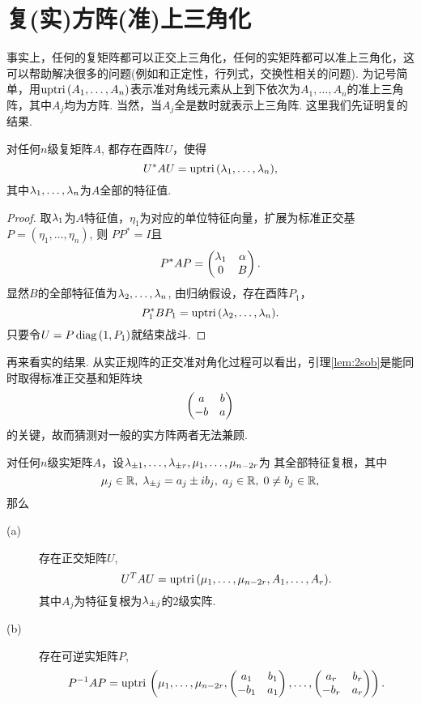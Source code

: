 \section{复(实)方阵(准)上三角化}
事实上，任何的复矩阵都可以正交上三角化，任何的实矩阵都可以准上三角化，这可以帮助解决很多的问题(例如和正定性，行列式，交换性相关的问题). 为记号简单，用$\operatorname*{uptri\,}(A_1,\dots,A_n)$表示准对角线元素从上到下依次为$A_1,\dots,A_n$的准上三角阵，其中$A_j$均为方阵. 当然，当$A_j$全是数时就表示上三角阵. 这里我们先证明复的结果.
\begin{thm}
	对任何$n$级复矩阵$A$, 都存在酉阵$U$，使得
	\[U^*AU=\operatorname*{uptri\,}(\lambda_1,\dots,\lambda_n),\]
	其中$\lambda_1,\dots,\lambda_n$为$A$全部的特征值.
\end{thm}
\begin{proof}
	取$\lambda_1$为$A$特征值，$\eta_1$为对应的单位特征向量，扩展为标准正交基$P=(\eta_1,\dots,\eta_n)$, 则
	$PP^*=I$且
	\[P^*AP=\begin{pmatrix}\lambda_1 & \alpha\\0 & B\end{pmatrix}.\]
	显然$B$的全部特征值为$\lambda_2,\dots,\lambda_n$, 由归纳假设，存在酉阵$P_1$，
	\[P_1^*B P_1=\operatorname*{uptri\,}(\lambda_2,\dots,\lambda_n).\]
	只要令$U=P\operatorname*{diag\,}(1,P_1)$就结束战斗.
\end{proof}
再来看实的结果. 从实正规阵的正交准对角化过程可以看出，引理\ref{lem:2sob}是能同时取得标准正交基和矩阵块
\[\begin{pmatrix} a & b\\ -b & a\end{pmatrix}\]
的关键，故而猜测对一般的实方阵两者无法兼顾.
\begin{thm}
	对任何$n$级实矩阵$A$，设$\lambda_{\pm 1},\dots,\lambda_{\pm r},\mu_1,\dots,\mu_{n-2r}$为
	其全部特征复根，其中
	\[\mu_j\in\mathbb{R},\;\lambda_{\pm j}=a_j\pm i b_j,\;a_j\in\mathbb{R},\;0\neq b_j\in \mathbb{R},\]
	那么
	\begin{description}
	\item[(a)] 存在正交矩阵$U$,
	\begin{equation}\label{eq:rup_1}
	U^T A U=\operatorname*{uptri\,}(\mu_1,\dots,\mu_{n-2r},A_1,\dots,A_r).
	\end{equation}
	其中$A_j$为特征复根为$\lambda_{\pm j}$的$2$级实阵.
	\item[(b)] 存在可逆实矩阵$P$,
	\begin{equation}\label{eq:rup_2}
	P^{-1} AP=\operatorname*{uptri\,}\left(\mu_1,\dots,\mu_{n-2r},
	\begin{pmatrix} a_1 & b_1\\ -b_1 & a_1\end{pmatrix},\dots,\begin{pmatrix} a_r & b_r\\ -b_r & a_r\end{pmatrix}\right).
	\end{equation}
	\end{description}
\end{thm}
